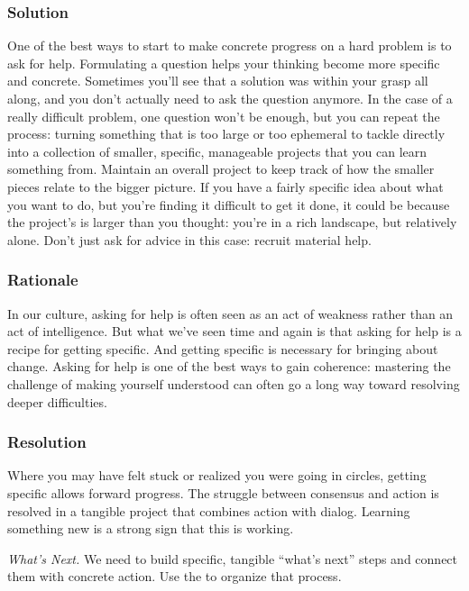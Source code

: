 \subsubsection*{Solution} 
One of the best ways to start to make concrete progress on a hard problem is to ask for help.   Formulating a question helps your thinking become more specific and concrete.  Sometimes you'll see that a solution was within your grasp all along, and you don't actually need to ask the question anymore.  In the case of a really difficult problem, one question won't be enough, but you can repeat the process: turning something that is too large or too ephemeral to tackle directly into a collection of smaller, specific, manageable projects that you can learn something from.  Maintain an overall project  to keep track of how the smaller pieces relate to the bigger picture.  If you have a fairly specific idea about what you want to do, but you're finding it difficult to get it done, it could be because the project's  is larger than you thought: you're in a rich landscape, but relatively alone.  Don't just ask for advice in this case: recruit material help.

\subsubsection*{Rationale} 
In our culture, asking for help is often seen as an act of weakness rather than an act of intelligence.
But what we've seen time and again is that asking for help is a recipe for getting specific.
And getting specific is necessary for bringing about change.  Asking for help is one
of the best ways to gain coherence: mastering the challenge of making yourself understood can often go a long way
toward resolving deeper difficulties.  

\subsubsection*{Resolution}
Where you may have felt stuck or realized you were going in circles, getting specific allows forward progress.  The struggle between consensus and action is resolved in a tangible project that combines action with dialog.  Learning something new is a strong sign that this is working.

\begin{framed}
\emph{What's Next.}
We need to build specific, tangible ``what's next'' steps and connect them with concrete action. Use the  to organize that process. 
\end{framed}

